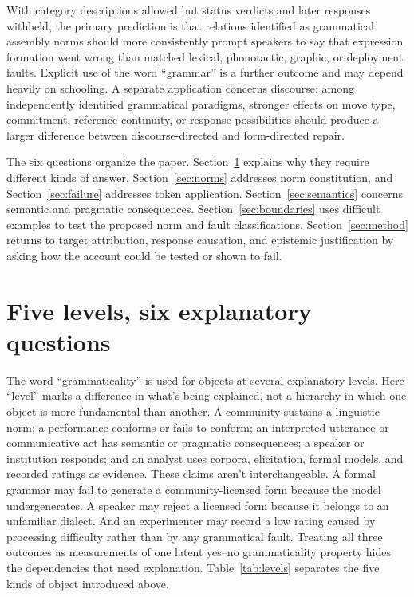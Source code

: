 \documentclass[12pt,letterpaper]{article}
\begin{document}
With category descriptions allowed but status verdicts and later responses
withheld, the primary prediction is that relations identified as grammatical
assembly norms should more consistently
prompt speakers to say that expression formation went wrong than matched lexical,
phonotactic, graphic, or deployment faults. Explicit use of the word
\enquote{grammar} is a further outcome and may depend heavily on schooling. A
separate application concerns discourse: among independently identified
grammatical paradigms, stronger effects on move type, commitment, reference
continuity, or response possibilities should produce a larger difference between
discourse-directed and form-directed repair.

The six questions organize the paper. Section~\ref{sec:levels} explains why they
require different kinds of answer. Section~\ref{sec:norms} addresses norm
constitution, and Section~\ref{sec:failure} addresses token application.
Section~\ref{sec:semantics} concerns semantic and pragmatic consequences.
Section~\ref{sec:boundaries} uses difficult examples to test the proposed norm and
fault classifications. Section~\ref{sec:method} returns to target attribution,
response causation, and epistemic justification by asking how the account could be
tested or shown to fail.


\section{Five levels, six explanatory questions}
\label{sec:levels}

The word \enquote{grammaticality} is used for objects at several explanatory
levels. Here \enquote{level} marks a difference in what's being explained, not
a hierarchy in which one object is more fundamental than another. A community
sustains a linguistic norm; a performance conforms or fails to conform; an
interpreted utterance or communicative act has semantic or pragmatic
consequences; a speaker or institution responds; and an analyst uses corpora,
elicitation, formal models, and recorded ratings as evidence. These claims aren't
interchangeable. A formal grammar may fail
to generate a community-licensed form because the model undergenerates. A speaker
may reject a licensed form because it belongs to an unfamiliar dialect. And an
experimenter may record a low rating caused by processing difficulty rather than
by any grammatical fault. Treating all three outcomes as measurements of one
latent yes--no grammaticality property hides the dependencies that need
explanation.
Table~\ref{tab:levels} separates the five kinds of object introduced above.
\end{document}
